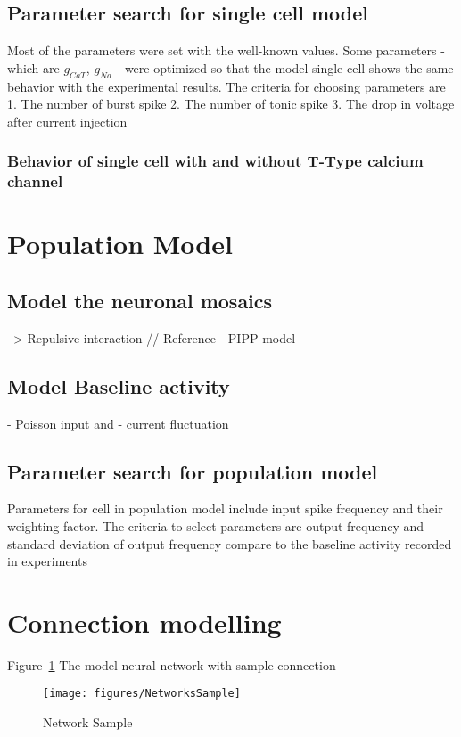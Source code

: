 
\subsection{Parameter search for single cell model}
Most of the parameters were set with the well-known values. Some parameters - which are 
$g_{CaT}$, $g_{Na}$ - were optimized so that the model single cell shows the same behavior with the experimental results. 
The criteria for choosing parameters are 
1. The number of burst spike
2. The number of tonic spike
3. The drop in voltage after current injection




\subsubsection{Behavior of single cell with and without T-Type calcium channel}


\section{Population Model}
\subsection{Model the neuronal mosaics}
 --> Repulsive interaction  // Reference - PIPP model 
 \subsection{Model Baseline activity}
 - Poisson input 
 and 
 - current fluctuation 
 \subsection{Parameter search for population model}
 Parameters for cell in population model include input spike frequency and their weighting factor. 
 The criteria to select parameters are output frequency and standard deviation of output frequency compare to the baseline activity recorded in experiments


\section{Connection modelling }

Figure~\ref{fig:NetSample} The model neural network with sample connection
\begin{figure}
	\centering
	\texttt{[image: figures/NetworksSample]}
	\label{fig:NetSample}
	\caption{Network Sample}
\end{figure}

